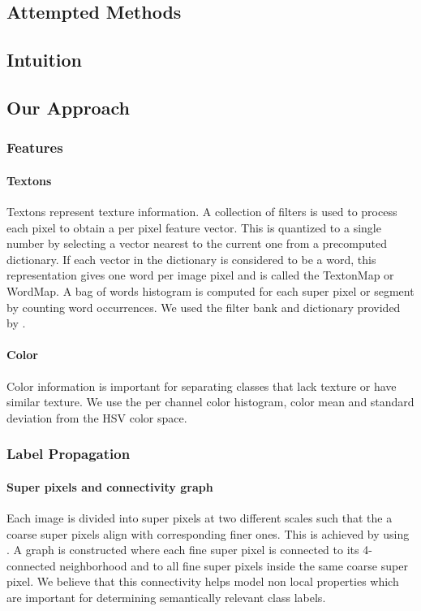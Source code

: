 \documentclass{article} %
\begin{document}
\subsection{Attempted Methods}
\subsection{Intuition}
\subsection{Our Approach}
\subsubsection{Features}
\paragraph{Textons}
Textons represent texture information.
A collection of filters is used to process each pixel to obtain a per
pixel feature vector.
This is quantized to a single number by selecting a vector nearest to the
current one from a precomputed dictionary.
If each vector in the dictionary is considered to be a word, this
representation gives one word per image pixel and is called the TextonMap
or WordMap. %
A bag of words histogram is computed for each super pixel or segment by
counting word occurrences.
We used the filter bank and dictionary provided by \cite{malisiewicz-cvpr08}.

\paragraph{Color}
Color information is important for separating classes that lack texture or
have similar texture.
We use the per channel color histogram, color mean and standard deviation
from the HSV color space.
\subsubsection{Label Propagation}
\paragraph{Super pixels and connectivity graph}
Each image is divided into super pixels at two different scales such that
the a coarse super pixels align with corresponding finer ones.
This is achieved by using \cite{}.%
A graph is constructed where each fine super pixel is connected to its
4-connected neighborhood and to all fine super pixels inside the same
coarse super pixel.
We believe that this connectivity helps model non local properties which
are important for determining semantically relevant class labels.
\end{document}

